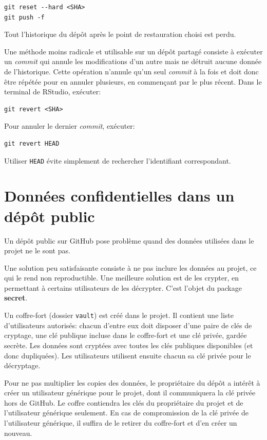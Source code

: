\documentclass[
  12pt,
  french,
  a4paper,
  extrafontsizes,onecolumn,openright
  ]{memoir}
\begin{document}
\begin{verbatim}
git reset --hard <SHA>
git push -f
\end{verbatim}

Tout l'historique du dépôt après le point de restauration choisi est perdu.

Une méthode moins radicale et utilisable sur un dépôt partagé consiste à exécuter un \emph{commit} qui annule les modifications d'un autre mais ne détruit aucune donnée de l'historique.
Cette opération n'annule qu'un seul \emph{commit} à la fois et doit donc être répétée pour en annuler plusieurs, en commençant par le plus récent.
Dans le terminal de RStudio, exécuter:

\begin{verbatim}
git revert <SHA>
\end{verbatim}

Pour annuler le dernier \emph{commit}, exécuter:

\begin{verbatim}
git revert HEAD
\end{verbatim}

Utiliser \texttt{HEAD} évite simplement de rechercher l'identifiant correspondant.

\section{Données confidentielles dans un dépôt public}\label{sec:confidentiel}

Un dépôt public sur GitHub pose problème quand des données utilisées dans le projet ne le sont pas.

Une solution peu satisfaisante consiste à ne pas inclure les données au projet, ce qui le rend non reproductible.
Une meilleure solution est de les crypter, en permettant à certains utilisateurs de les décrypter.
C'est l'objet du package \textbf{secret}.

Un coffre-fort (dossier \texttt{vault}) est créé dans le projet.
Il contient une liste d'utilisateurs autorisés: chacun d'entre eux doit disposer d'une paire de clés de cryptage, une clé publique incluse dans le coffre-fort et une clé privée, gardée secrète.
Les données sont cryptées avec toutes les clés publiques disponibles (et donc dupliquées).
Les utilisateurs utilisent ensuite chacun sa clé privée pour le décryptage.

Pour ne pas multiplier les copies des données, le propriétaire du dépôt a intérêt à créer un utilisateur générique pour le projet, dont il communiquera la clé privée hors de GitHub.
Le coffre contiendra les clés du propriétaire du projet et de l'utilisateur générique seulement.
En cas de compromission de la clé privée de l'utilisateur générique, il suffira de le retirer du coffre-fort et d'en créer un nouveau.
\end{document}
